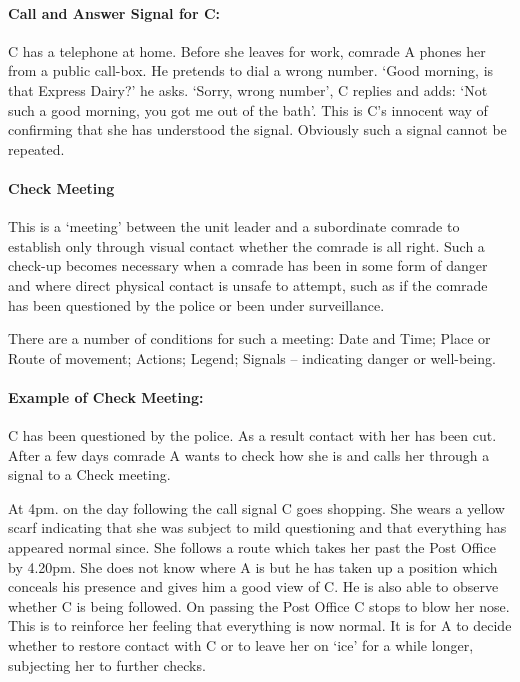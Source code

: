 \paragraph{Call and Answer Signal for C:}

C has a telephone at home. Before she leaves for work, comrade A phones
her from a public call-box. He pretends to dial a wrong number. `Good
morning, is that Express Dairy?' he asks. `Sorry, wrong number', C
replies and adds: `Not such a good morning, you got me out of the bath'.
This is C's innocent way of confirming that she has understood the
signal. Obviously such a signal cannot be repeated.

\paragraph{ Check Meeting}

This is a `meeting' between the unit leader and a subordinate comrade to
establish only through visual contact whether the comrade is all right.
Such a check-up becomes necessary when a comrade has been in some form
of danger and where direct physical contact is unsafe to attempt, such
as if the comrade has been questioned by the police or been under
surveillance.

There are a number of conditions for such a meeting: Date and Time;
Place or Route of movement; Actions; Legend; Signals -- indicating
danger or well-being.

\paragraph{Example of Check Meeting:}

C has been questioned by the police. As a result contact with her has
been cut. After a few days comrade A wants to check how she is and calls
her through a signal to a Check meeting.

At 4pm. on the day following the call signal C goes shopping. She wears
a yellow scarf indicating that she was subject to mild questioning and
that everything has appeared normal since. She follows a route which
takes her past the Post Office by 4.20pm. She does not know where A is
but he has taken up a position which conceals his presence and gives him
a good view of C. He is also able to observe whether C is being
followed. On passing the Post Office C stops to blow her nose. This is
to reinforce her feeling that everything is now normal. It is for A to
decide whether to restore contact with C or to leave her on `ice' for a
while longer, subjecting her to further checks.

